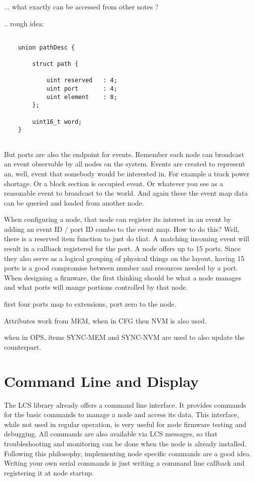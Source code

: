 ... what exactly can be accessed from other notes ?

.. rough idea:

\lstset{language=c++, style=codesnippetstyle}
\begin{lstlisting}
   
    union pathDesc { 

        struct path {

            uint reserved   : 4;
            uint port       : 4;
            uint element    : 8;
        };

        uint16_t word;
    }
    
\end{lstlisting}


But ports are also the endpoint for events. Remember each node can broadcast an event observable by all nodes on the system. Events are created to represent an, well, event that somebody would be interested in. For example a track power shortage. Or a block section is occupied event. Or whatever you see as a reasonable event to broadcast to the world. And again these the event map data can be queried and loaded from another node.

When configuring a node, that node can register its interest in an event by adding an event ID / port ID combo to the event map. How to do this? Well, there is a reserved item function to just do that. A matching incoming event will result in a callback registered for the port. A node offers up to 15 ports. Since they also serve as a logical grouping of physical things on the layout, having 15 ports is a good compromise between number and resources needed by a port. When designing a firmware, the first thinking should be what a node manages and what ports will mange portions controlled by that node.

first four ports map to extensions, port zero to the node.

Attributes work from MEM, when in CFG then NVM is also used.

when in OPS, items SYNC-MEM and SYNC-NVM are used to also update the counterpart.

\section{Command Line and Display}

The LCS library already offers a command line interface. It provides commands for the basic commands to manage a node and access its data. This interface, while not used in regular operation, is very useful for node firmware testing and debugging. All commands are also available via LCS messages, so that troubleshooting and monitoring can be done when the node is already installed. Following this philosophy, implementing node specific commands are a good idea. Writing your own serial commands is just writing a command line callback and registering it at node startup.

